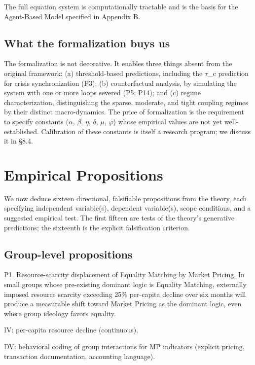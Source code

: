 \documentclass[12pt,a4paper]{article}
\begin{document}
The full equation system is computationally tractable and is the basis for the Agent-Based Model specified in Appendix B.

\subsection{What the formalization buys us}

The formalization is not decorative. It enables three things absent from the original framework: (a) threshold-based predictions, including the $\tau$_c prediction for crisis synchronization (P3); (b) counterfactual analysis, by simulating the system with one or more loops severed (P5; P14); and (c) regime characterization, distinguishing the sparse, moderate, and tight coupling regimes by their distinct macro-dynamics. The price of formalization is the requirement to specify constants ($\alpha$, $\beta$, $\eta$, $\delta$, $\mu$, $\varphi$) whose empirical values are not yet well-established. Calibration of these constants is itself a research program; we discuss it in §8.4.



\section{Empirical Propositions}

We now deduce sixteen directional, falsifiable propositions from the theory, each specifying independent variable(s), dependent variable(s), scope conditions, and a suggested empirical test. The first fifteen are tests of the theory's generative predictions; the sixteenth is the explicit falsification criterion.

\subsection{Group-level propositions}

P1. Resource-scarcity displacement of Equality Matching by Market Pricing. In small groups whose pre-existing dominant logic is Equality Matching, externally imposed resource scarcity exceeding 25\% per-capita decline over six months will produce a measurable shift toward Market Pricing as the dominant logic, even where group ideology favors equality.


IV: per-capita resource decline (continuous).

DV: behavioral coding of group interactions for MP indicators (explicit pricing, transaction documentation, accounting language).
\end{document}
